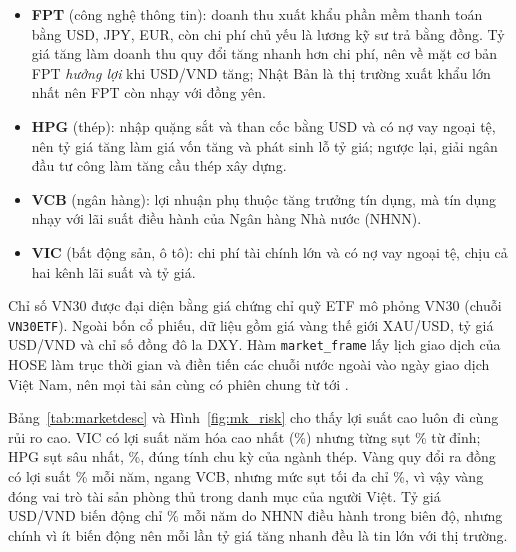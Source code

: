 \begin{itemize}
  \item \textbf{FPT} (công nghệ thông tin): doanh thu xuất khẩu phần mềm thanh toán bằng USD, JPY, EUR, còn chi phí
        chủ yếu là lương kỹ sư trả bằng đồng. Tỷ giá tăng làm doanh thu quy đổi tăng nhanh hơn chi phí, nên về mặt
        cơ bản FPT \emph{hưởng lợi} khi USD/VND tăng; Nhật Bản là thị trường xuất khẩu lớn nhất nên FPT còn nhạy với
        đồng yên.
  \item \textbf{HPG} (thép): nhập quặng sắt và than cốc bằng USD và có nợ vay ngoại tệ, nên tỷ giá tăng làm giá vốn
        tăng và phát sinh lỗ tỷ giá; ngược lại, giải ngân đầu tư công làm tăng cầu thép xây dựng.
  \item \textbf{VCB} (ngân hàng): lợi nhuận phụ thuộc tăng trưởng tín dụng, mà tín dụng nhạy với lãi suất điều hành
        của Ngân hàng Nhà nước (NHNN).
  \item \textbf{VIC} (bất động sản, ô tô): chi phí tài chính lớn và có nợ vay ngoại tệ, chịu cả hai kênh lãi suất
        và tỷ giá.
\end{itemize}

Chỉ số VN30 được đại diện bằng giá chứng chỉ quỹ ETF mô phỏng VN30 (chuỗi \texttt{VN30ETF}). Ngoài bốn cổ phiếu, dữ liệu gồm giá vàng thế giới XAU/USD, tỷ giá USD/VND và chỉ số đồng
đô la DXY. Hàm \texttt{market\_frame} lấy lịch giao dịch của HOSE làm trục thời gian và điền tiến các chuỗi nước
ngoài vào ngày giao dịch Việt Nam, nên mọi tài sản cùng có  phiên chung từ  tới
.



Bảng~\ref{tab:marketdesc} và Hình~\ref{fig:mk_risk} cho thấy lợi suất cao luôn đi cùng rủi ro cao. VIC có lợi suất
năm hóa cao nhất (\%) nhưng từng sụt \% từ
đỉnh; HPG sụt sâu nhất, \%, đúng tính chu kỳ của ngành thép. Vàng quy đổi ra
đồng có lợi suất \% mỗi năm, ngang VCB, nhưng mức sụt tối đa chỉ
\%, vì vậy vàng đóng vai trò tài sản phòng thủ trong danh mục của người Việt.
Tỷ giá USD/VND biến động chỉ \% mỗi năm do NHNN điều hành trong biên độ, nhưng
chính vì ít biến động nên mỗi lần tỷ giá tăng nhanh đều là tin lớn với thị trường.

